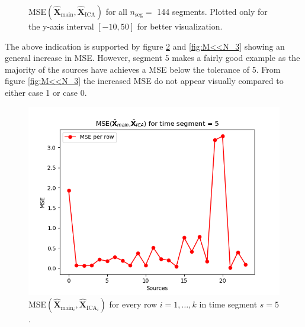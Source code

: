\begin{figure}[H]
\begin{widepage}
\begin{minipage}[t]{.45\textwidth}
	\caption{MSE$\left(\hat{\mathbf{X}}_{\text{main}},\hat{\mathbf{X}}_{\text{ICA}}\right)$ for all $n_{\text{seg}} = $ 144 segments. Plotted only for the y-axis interval $[-10, 50]$ for better visualization.}
	\label{fig:M<<N_1_2}
    \end{minipage}
\end{widepage}
\end{figure}
\noindent 
The above indication is supported by figure \ref{fig:M<<N_2} and \ref{fig:M<<N_3} showing an general increase in MSE. 
However, segment 5 makes a fairly good example as the majority of the sources have achieves a MSE below the tolerance of 5. 
From figure \ref{fig:M<<N_3} the increased MSE do not appear visually compared to either case 1 or case 0.        
\begin{figure}[H]
\begin{widepage}
    \begin{minipage}[t]{.49\textwidth}
\centering
\includegraphics[width=1\linewidth]{figures/ch_7/resultat/mse_second_removed_ica_timeseg5.png}
\caption{MSE$\left(\hat{\mathbf{X}}_{\text{main}_{i}},\hat{\mathbf{X}}_{\text{ICA}_{i}}\right)$ for every row $i = 1, \dots, k$ in time segment $s = 5$.}
\label{fig:M<<N_2}
\end{minipage} 
\hspace{.5cm}
\begin{minipage}[t]{.49\textwidth}
\centering

\end{minipage}
\end{widepage}
\end{figure}
